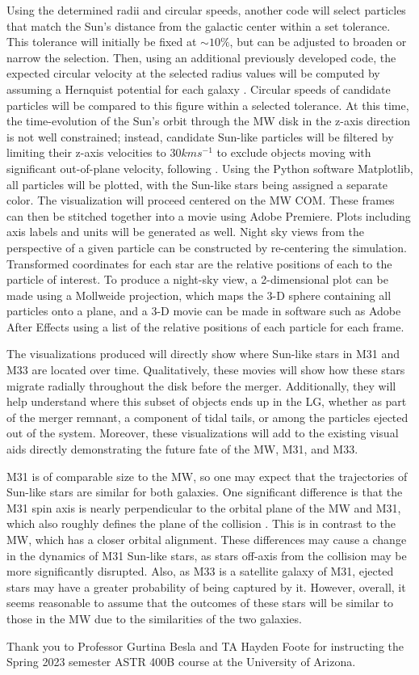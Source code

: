 \documentclass[twocolumn]{aastex631}
\begin{document}
Using the determined radii and circular speeds, another code will select particles that match the Sun's distance from the galactic center within a set tolerance. This tolerance will initially be fixed at $\sim 10\%$, but can be adjusted to broaden or narrow the selection. Then, using an additional previously developed code, the expected circular velocity at the selected radius values will be computed by assuming a Hernquist potential for each galaxy \citep{1990ApJ...356..359H}. Circular speeds of candidate particles will be compared to this figure within a selected tolerance. At this time, the time-evolution of the Sun's orbit through the MW disk in the z-axis direction is not well constrained; instead, candidate Sun-like particles will be filtered by limiting their z-axis velocities to $30 km s^{-1}$ to exclude objects moving with significant out-of-plane velocity, following \citet{2012ApJ...753....9V}. Using the Python software Matplotlib, all particles will be plotted, with the Sun-like stars being assigned a separate color. The visualization will proceed centered on the MW COM. These frames can then be stitched together into a movie using Adobe Premiere. Plots including axis labels and units will be generated as well. Night sky views from the perspective of a given particle can be constructed by re-centering the simulation. Transformed coordinates for each star are the relative positions of each to the particle of interest. To produce a night-sky view, a 2-dimensional plot can be made using a Mollweide projection, which maps the 3-D sphere containing all particles onto a plane, and a 3-D movie can be made in software such as Adobe After Effects using a list of the relative positions of each particle for each frame. 

The visualizations produced will directly show where Sun-like stars in M31 and M33 are located over time. Qualitatively, these movies will show how these stars migrate radially throughout the disk before the merger. Additionally, they will help understand where this subset of objects ends up in the LG, whether as part of the merger remnant, a component of tidal tails, or among the particles ejected out of the system. Moreover, these visualizations will add to the existing visual aids directly demonstrating the future fate of the MW, M31, and M33.

M31 is of comparable size to the MW, so one may expect that the trajectories of Sun-like stars are similar for both galaxies. One significant difference is that the M31 spin axis is nearly perpendicular to the orbital plane of the MW and M31, which also roughly defines the plane of the collision \citep{2012ApJ...753....9V}. This is in contrast to the MW, which has a closer orbital alignment. These differences may cause a change in the dynamics of M31 Sun-like stars, as stars off-axis from the collision may be more significantly disrupted. Also, as M33 is a satellite galaxy of M31, ejected stars may have a greater probability of being captured by it. However, overall, it seems reasonable to assume that the outcomes of these stars will be similar to those in the MW due to the similarities of the two galaxies.

\begin{acknowledgments}
Thank you to Professor Gurtina Besla and TA Hayden Foote for instructing the Spring 2023 semester ASTR 400B course at the University of Arizona.
\end{acknowledgments}

{}

\end{document}
